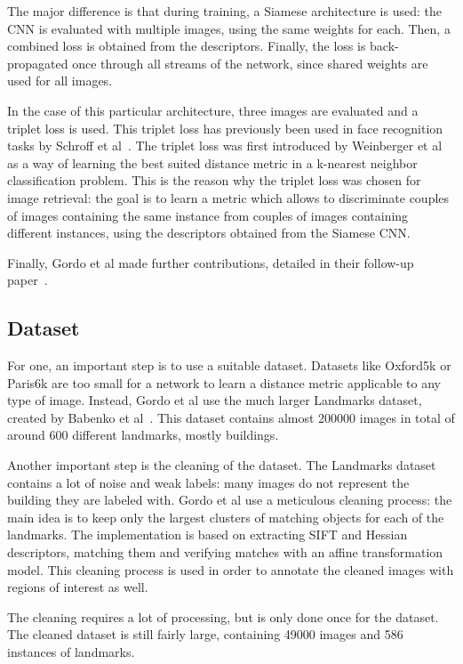 The major difference is that during training, a Siamese architecture is
used: the CNN is evaluated with multiple images, using the same weights
for each. Then, a combined loss is obtained from the descriptors.
Finally, the loss is back-propagated once through all streams of the network,
since shared weights are used for all images.

In the case of this particular architecture, three images are evaluated
and a triplet loss is used. This triplet loss has previously been used
in face recognition tasks by Schroff et al~\cite{schroff_facenet:_2015}.
The triplet loss was first introduced by
Weinberger et al~\cite{weinberger_distance_2006} as a way of learning
the best suited distance metric in a k-nearest neighbor classification
problem.
This is the reason why the triplet loss was chosen for image retrieval:
the goal is to learn a metric which allows to discriminate couples of
images containing the same instance from couples of images containing
different instances, using the descriptors obtained from the Siamese
CNN.

Finally, Gordo et al made further contributions, detailed in their
follow-up paper~\cite{gordo_end--end_2016}.
\subsection{Dataset}
For one, an important step is to use a suitable dataset. Datasets like
Oxford5k or Paris6k are too small for a network to learn a distance metric
applicable to any type of image. Instead, Gordo et al use the much larger
Landmarks dataset, created by Babenko et al~\cite{babenko_neural_2014}.
This dataset contains almost 200000 images in total of around 600
different landmarks, mostly buildings.

Another important step is the cleaning of the dataset. The Landmarks
dataset contains a lot of noise and weak labels: many images do not
represent the building they are labeled with. Gordo et al use a meticulous
cleaning process: the main idea is to keep only the largest clusters
of matching objects for each of the landmarks. The implementation is
based on extracting SIFT and Hessian descriptors,
matching them and verifying matches with an affine transformation model.
This cleaning process is used in order to annotate the cleaned images
with regions of interest as well.

The cleaning requires a lot of processing,
but is only done once for the dataset.
The cleaned dataset is still fairly large, containing 49000 images and
586 instances of landmarks.

